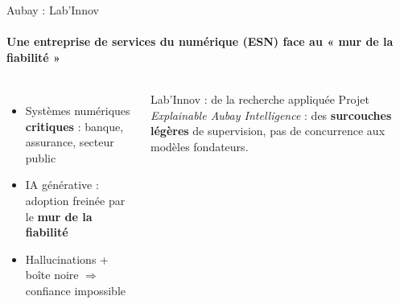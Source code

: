 \begin{frame}{Aubay : Lab'Innov}
  \framesubtitle{Une entreprise de services du numérique (ESN) face au « mur de la fiabilité »}
  \begin{columns}[T,onlytextwidth]
      \vspace{0.22cm}
      \vspace{0.15cm}
      \begin{itemize}
        \item Systèmes numériques \textbf{critiques} : banque, assurance, secteur public
        \item IA générative : adoption freinée par le \textbf{mur de la fiabilité}
        \item Hallucinations + boîte noire $\Rightarrow$ confiance impossible
      \end{itemize}
      \vspace{0.3cm}
      \hspace*{1.45em}%
      \begin{minipage}{\dimexpr\linewidth-1.45em\relax}
        \begin{block}{Lab'Innov : de la recherche appliquée}
          \small Projet \textit{Explainable Aubay Intelligence} : des \textbf{surcouches légères} de supervision, pas de concurrence aux modèles fondateurs.
        \end{block}
      \end{minipage}
  \end{columns}
\end{frame}

